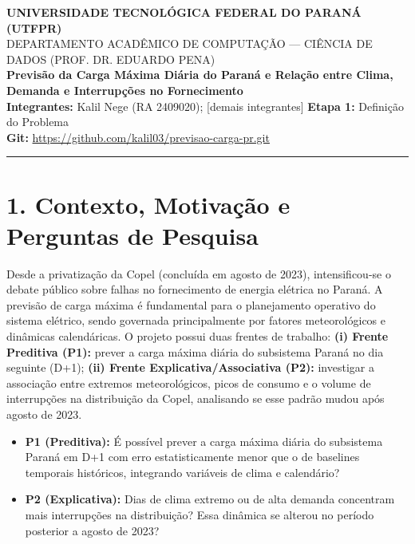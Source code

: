 \documentclass[
  a4paper,
  10pt,
  oneside,
  english,
  brazilian,
]{memoir}
\begin{document}
\Textual

\begin{center}
  {\bfseries\normalsize UNIVERSIDADE TECNOLÓGICA FEDERAL DO PARANÁ (UTFPR)}\\[0.15em]
  {\footnotesize DEPARTAMENTO ACADÊMICO DE COMPUTAÇÃO --- CIÊNCIA DE DADOS (PROF. DR. EDUARDO PENA)}\\[0.5em]
  {\bfseries\large Previsão da Carga Máxima Diária do Paraná e Relação entre Clima, Demanda e Interrupções no Fornecimento}\\[0.35em]
  {\small\textbf{Integrantes:} Kalil Nege (RA 2409020); [demais integrantes] \quad\textbar\quad \textbf{Etapa 1:} Definição do Problema}\\[0.2em]
  {\footnotesize\textbf{Git:} \url{https://github.com/kalil03/previsao-carga-pr.git}}
\end{center}
\vspace{-0.4em}
\hrule
\vspace{0.4em}

\section*{1. Contexto, Motivação e Perguntas de Pesquisa}

Desde a privatização da Copel (concluída em agosto de 2023), intensificou-se o debate público sobre falhas no fornecimento de energia elétrica no Paraná. A previsão de carga máxima é fundamental para o planejamento operativo do sistema elétrico, sendo governada principalmente por fatores meteorológicos e dinâmicas calendáricas. O projeto possui duas frentes de trabalho: \textbf{(i) Frente Preditiva (P1):} prever a carga máxima diária do subsistema Paraná no dia seguinte (D+1); \textbf{(ii) Frente Explicativa/Associativa (P2):} investigar a associação entre extremos meteorológicos, picos de consumo e o volume de interrupções na distribuição da Copel, analisando se esse padrão mudou após agosto de 2023.

\begin{itemize}[leftmargin=12pt, itemsep=-2pt, topsep=1pt]
  \item \textbf{P1 (Preditiva):} É possível prever a carga máxima diária do subsistema Paraná em D+1 com erro estatisticamente menor que o de baselines temporais históricos, integrando variáveis de clima e calendário?
  \item \textbf{P2 (Explicativa):} Dias de clima extremo ou de alta demanda concentram mais interrupções na distribuição? Essa dinâmica se alterou no período posterior a agosto de 2023?
\end{itemize}
\end{document}
